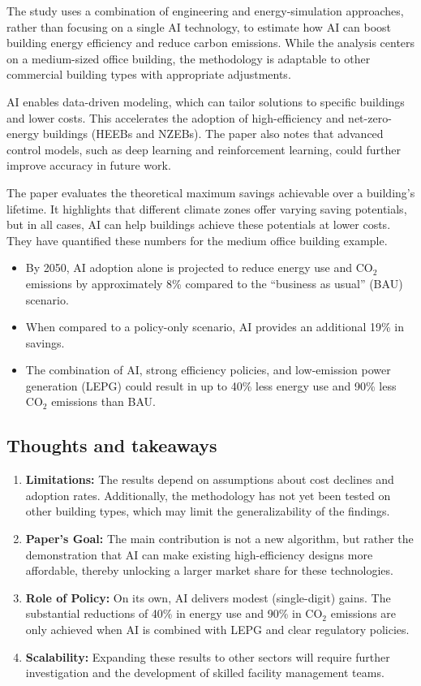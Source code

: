 \documentclass[conference,a4paper]{IEEEtran}
\begin{document}
The study uses a combination of engineering and energy-simulation approaches, rather than focusing on a single AI technology, to estimate how AI can boost building energy efficiency and reduce carbon emissions. While the analysis centers on a medium-sized office building, the methodology is adaptable to other commercial building types with appropriate adjustments.

AI enables data-driven modeling, which can tailor solutions to specific buildings and lower costs. This accelerates the adoption of high-efficiency and net-zero-energy buildings (HEEBs and NZEBs). The paper also notes that advanced control models, such as deep learning and reinforcement learning, could further improve accuracy in future work.

The paper evaluates the theoretical maximum savings achievable over a building’s lifetime. It highlights that different climate zones offer varying saving potentials, but in all cases, AI can help buildings achieve these potentials at lower costs. They have quantified these numbers for the medium office building example.
\begin{itemize}
    \item By 2050, AI adoption alone is projected to reduce energy use and CO$_2$ emissions by approximately 8\% compared to the “business as usual” (BAU) scenario.
    \item When compared to a policy-only scenario, AI provides an additional 19\% in savings.
    \item The combination of AI, strong efficiency policies, and low-emission power generation (LEPG) could result in up to 40\% less energy use and 90\% less CO$_2$ emissions than BAU.
\end{itemize}

\subsection*{Thoughts and takeaways}
\begin{enumerate}
    \item \textbf{Limitations:} The results depend on assumptions about cost declines and adoption rates. Additionally, the methodology has not yet been tested on other building types, which may limit the generalizability of the findings.
    \item \textbf{Paper’s Goal:} The main contribution is not a new algorithm, but rather the demonstration that AI can make existing high-efficiency designs more affordable, thereby unlocking a larger market share for these technologies.
    \item \textbf{Role of Policy:} On its own, AI delivers modest (single-digit) gains. The substantial reductions of 40\% in energy use and 90\% in CO$_2$ emissions are only achieved when AI is combined with LEPG and clear regulatory policies.
    \item \textbf{Scalability:} Expanding these results to other sectors will require further investigation and the development of skilled facility management teams.
\end{enumerate}
\end{document}
